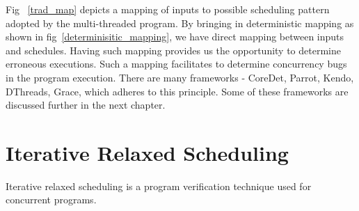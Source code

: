 Fig~ \ref{trad_map} depicts a mapping of inputs to possible scheduling pattern adopted by the multi-threaded program. 
By bringing in deterministic mapping as shown in fig~\ref{determinisitic_mapping}, we have direct mapping between inputs and schedules. 
Having such mapping provides us the opportunity to determine erroneous executions. 
Such a mapping facilitates to determine concurrency bugs in the program execution. 
There are many frameworks - CoreDet\cite{coredet}, Parrot\cite{parrot}, Kendo\cite{kendo}, DThreads\cite{dthreads}, Grace\cite{grace}, which adheres to this principle. 
Some of these frameworks are discussed further in the next chapter.

\section{Iterative Relaxed Scheduling}

Iterative relaxed scheduling is a program verification technique used for concurrent programs. 
